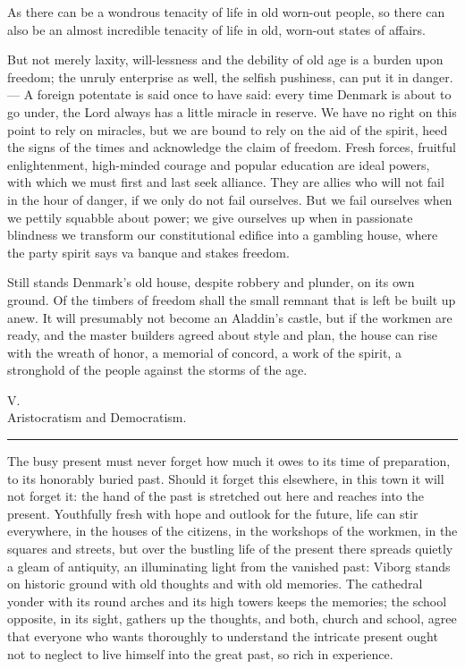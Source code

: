 \documentclass[12pt,a4paper,openany]{book}
\newcommand{\opage}[1]{\marginnote{\footnotesize\textit{[#1]}}}
\newcommand{\lecture}[2]{\clearpage\phantomsection\addcontentsline{toc}{chapter}{#1 #2}\begin{center}{\large #1}\\[0.6em]{\large #2}\\[0.4em]\rule{3em}{0.4pt}\end{center}\medskip\noindent\ignorespaces}
\begin{document}
As there can be a wondrous tenacity of life in
old worn-out people, so there can also be an
almost incredible tenacity of life in old, worn-out states of affairs.


But not merely laxity, will-lessness and the debility of old age
is a burden upon freedom; the
unruly enterprise as well, the selfish pushiness, can
put it in danger. --- A foreign potentate is said once
to have said: every time Denmark is about to go
under, the Lord always has a little miracle in reserve.
We have no right on this point to rely on miracles,
but we are bound to rely on the aid of the spirit,
heed the signs of the times and acknowledge the claim of freedom.
Fresh forces, fruitful enlightenment,
high-minded courage and popular education are ideal powers,
with which we must first and last seek alliance. They
are allies who will not fail in the hour of danger, if
we only do not fail ourselves. But we fail ourselves
when we pettily squabble about power; we give ourselves up
when in passionate blindness we transform our constitutional edifice
into a gambling house, where the party spirit says
va banque and stakes freedom.

Still stands Denmark's old house, despite robbery and
plunder, on its own ground. Of the timbers of freedom
\setcounter{footnote}{0}%
\opage{71}shall the small remnant that is left be built up anew.
It will presumably not become an Aladdin's castle, but if the workmen are
ready, and the master builders agreed about style and plan,
the house can rise with the wreath of honor, a memorial of concord,
a work of the spirit, a stronghold of the people against the storms
of the age.

\setcounter{footnote}{0}%
\lecture{V.} {Aristocratism and Democratism.}
\opage{72}The busy present must never forget how much it
owes to its time of preparation, to its honorably buried
past. Should it forget this elsewhere, in this
town it will not forget it: the hand of the past is stretched out here
and reaches into the present. Youthfully fresh with
hope and outlook for the future, life can stir everywhere,
in the houses of the citizens, in the workshops of the workmen, in
the squares and streets, but over the bustling life of the present there
spreads quietly a gleam of antiquity, an illuminating light from the
vanished past: Viborg stands on historic ground with
old thoughts and with old memories. The cathedral yonder
with its round arches and its high towers keeps the
memories; the school opposite, in its sight, gathers up the
thoughts, and both, church and school, agree that
everyone who wants thoroughly to understand the intricate present
ought not to neglect to live himself into the great past, so rich in experience.
\end{document}
